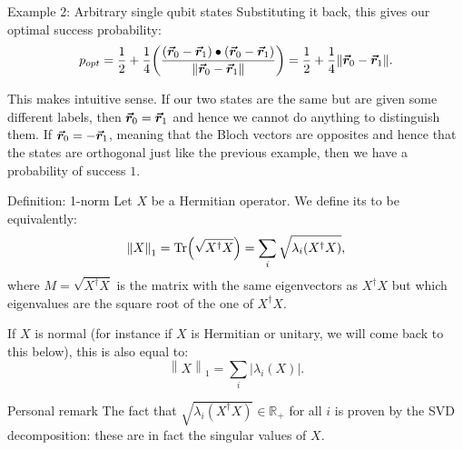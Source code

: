 \documentclass[a4paper]{article}
\begin{document}
\begin{parag}{Example 2: Arbitrary single qubit states}
    Substituting it back, this gives our optimal success probability: 
    \[p_{opt} = \frac{1}{2} + \frac{1}{4} \left(\frac{\left(\bvec{r}_0 - \bvec{r}_1\right) \dotprod \left(\bvec{r}_0 - \bvec{r}_1\right)}{\left\|\bvec{r}_0 - \bvec{r}_1\right\|}\right) = \frac{1}{2} + \frac{1}{4} \left\|\bvec{r}_0 - \bvec{r}_1\right\|.\]
    
    This makes intuitive sense. If our two states are the same but are given some different labels, then $\bm{\protect\vec{r}}_0 = \bm{\protect\vec{r}}_1$ and hence we cannot do anything to distinguish them. If $\bm{\protect\vec{r}}_0 = -\bm{\protect\vec{r}}_1$, meaning that the Bloch vectors are opposites and hence that the states are orthogonal just like the previous example, then we have a probability of success $1$.
\end{parag}

\begin{parag}{Definition: 1-norm}
    Let $X$ be a Hermitian operator. We define its  to be equivalently: 
    \[\left\|X\right\|_1 = \Tr\left(\sqrt{X^{\dagger} X}\right) = \sum_{i} \sqrt{\lambda_i\left(X^{\dagger} X\right)},\]
    where $M = \sqrt{X^{\dagger} X}$ is the matrix with the same eigenvectors as $X^{\dagger} X$ but which eigenvalues are the square root of the one of $X^{\dagger} X$. 

    If $X$ is normal (for instance if $X$ is Hermitian or unitary, we will come back to this below), this is also equal to:
    \[\left\|X\right\|_1 = \sum_{i} \left|\lambda_i\left(X\right)\right|.\]

    \begin{subparag}{Personal remark}
        The fact that $\sqrt{\lambda_i\left(X^{\dagger} X\right)} \in \mathbb{R}_+$ for all $i$ is proven by the SVD decomposition: these are in fact the singular values of $X$.
    \end{subparag}
\end{parag}
\end{document}
